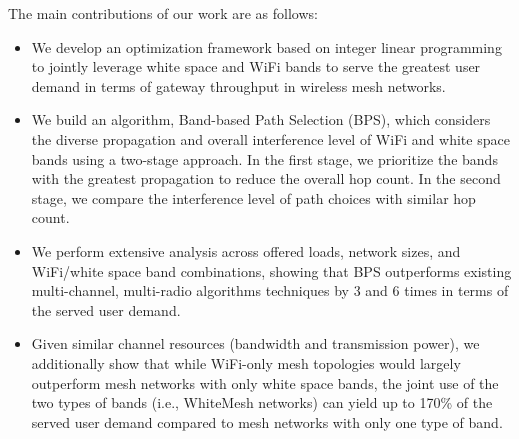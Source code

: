 The main contributions of our work are as follows:
\begin{itemize}
\item We develop an optimization framework based on integer
linear programming to jointly leverage white space and WiFi bands
to serve the greatest user demand in terms of gateway throughput 
in wireless mesh networks.  
\item We build an algorithm, Band-based Path 
Selection (BPS), which considers the diverse propagation 
and overall interference level of WiFi and white space bands using
a two-stage approach.  In the first stage, we prioritize the bands
with the greatest propagation to reduce the overall hop count. In the
second stage, we compare the interference level of path choices with
similar hop count. 
\item We perform extensive analysis across offered loads,
network sizes, and WiFi/white space band combinations, showing that BPS outperforms existing
multi-channel, multi-radio algorithms techniques by 3 and 6 times
in terms of the served user demand.  
\item Given similar channel resources
(bandwidth and transmission power), we additionally show that while
WiFi-only mesh topologies would largely outperform mesh networks with only
white space bands, the joint use of the two types of bands (i.e., WhiteMesh 
networks) can yield up to 170\% of the served user demand compared to mesh networks
with only one type of band.
\end{itemize}


